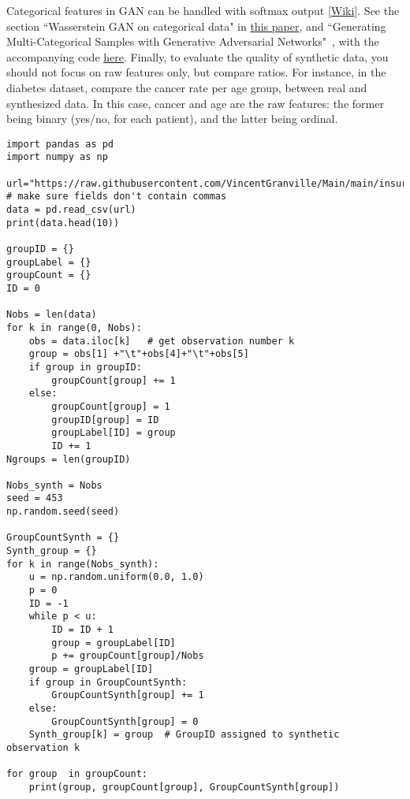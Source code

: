 \documentclass[oneside,10pt]{book}
\begin{document}
Categorical features in GAN can be handled with \textcolor{index}{softmax} output
 [\href{https://en.wikipedia.org/wiki/Softmax_function}{Wiki}]. See the section ``Wasserstein GAN on categorical data" in \href{https://medium.com/jungle-book/towards-data-set-augmentation-with-gans-9dd64e9628e6}{this paper}, and ``Generating Multi-Categorical Samples with Generative Adversarial Networks"~\cite{gancat18}, with the accompanying code \href{https://github.com/rcamino/multi-categorical-gans}{here}. Finally, to evaluate the quality of synthetic data, you should not focus on raw features only, but compare ratios. For instance, in the diabetes dataset, compare the cancer rate per age group, between real and synthesized data. In this case, cancer and age are the raw features: the former being binary (yes/no, for each patient), and the latter being ordinal.    
\vspace{1ex}

\begin{lstlisting}
import pandas as pd
import numpy as np

url="https://raw.githubusercontent.com/VincentGranville/Main/main/insurance.csv"
# make sure fields don't contain commas
data = pd.read_csv(url)
print(data.head(10))

groupID = {}
groupLabel = {}
groupCount = {}
ID = 0

Nobs = len(data)
for k in range(0, Nobs):  
    obs = data.iloc[k]   # get observation number k
    group = obs[1] +"\t"+obs[4]+"\t"+obs[5]
    if group in groupID: 
        groupCount[group] += 1
    else:
        groupCount[group] = 1
        groupID[group] = ID 
        groupLabel[ID] = group          
        ID += 1
Ngroups = len(groupID)

Nobs_synth = Nobs
seed = 453
np.random.seed(seed)

GroupCountSynth = {}
Synth_group = {}
for k in range(Nobs_synth):
    u = np.random.uniform(0.0, 1.0)
    p = 0
    ID = -1
    while p < u:
        ID = ID + 1
        group = groupLabel[ID]
        p += groupCount[group]/Nobs
    group = groupLabel[ID]
    if group in GroupCountSynth:
        GroupCountSynth[group] += 1 
    else:
        GroupCountSynth[group] = 0
    Synth_group[k] = group  # GroupID assigned to synthetic observation k

for group  in groupCount:
    print(group, groupCount[group], GroupCountSynth[group])

\end{lstlisting}
\end{document}
